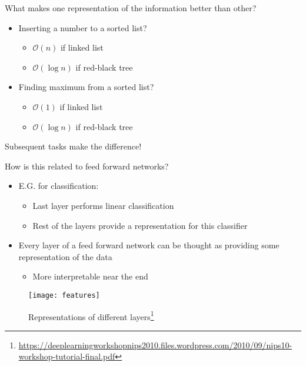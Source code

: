 \begin{frame}
What makes one representation of the information better than other?
\begin{itemize}
\item Inserting a number to a sorted list?
\begin{itemize}
\item $\mathcal{O}(n)$ if linked list
\item $\mathcal{O}(\log n)$ if red-black tree
\end{itemize}
\item Finding maximum from a sorted list?
\begin{itemize}
\item $\mathcal{O}(1)$ if linked list
\item $\mathcal{O}(\log n)$ if red-black tree
\end{itemize}
\end{itemize}
Subsequent tasks make the difference!
\end{frame}

\begin{frame}
How is this related to feed forward networks?
\begin{itemize}
\item E.G. for classification:
\begin{itemize}
\item Last layer performs linear classification
\item Rest of the layers provide a representation for this classifier
\end{itemize}
\item Every layer of a feed forward network can be thought as providing some representation of the data
\begin{itemize}
\item More interpretable near the end
\end{itemize}
\end{itemize}
\end{frame}

\begin{frame}
\begin{figure}[t]
\centering
\texttt{[image: features]} %
\caption{Representations of different layers\footnote{\url{https://deeplearningworkshopnips2010.files.wordpress.com/2010/09/nips10-workshop-tutorial-final.pdf}}}
\end{figure}

\end{frame}

